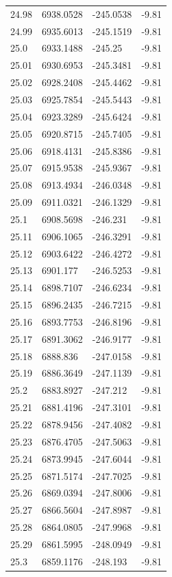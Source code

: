 \begin{table}[H]
\begin{tabular}{llll}
24.98 & 6938.0528 & -245.0538 & -9.81 \\
24.99 & 6935.6013 & -245.1519 & -9.81 \\
25.0 & 6933.1488 & -245.25 & -9.81 \\
25.01 & 6930.6953 & -245.3481 & -9.81 \\
25.02 & 6928.2408 & -245.4462 & -9.81 \\
25.03 & 6925.7854 & -245.5443 & -9.81 \\
25.04 & 6923.3289 & -245.6424 & -9.81 \\
25.05 & 6920.8715 & -245.7405 & -9.81 \\
25.06 & 6918.4131 & -245.8386 & -9.81 \\
25.07 & 6915.9538 & -245.9367 & -9.81 \\
25.08 & 6913.4934 & -246.0348 & -9.81 \\
25.09 & 6911.0321 & -246.1329 & -9.81 \\
25.1 & 6908.5698 & -246.231 & -9.81 \\
25.11 & 6906.1065 & -246.3291 & -9.81 \\
25.12 & 6903.6422 & -246.4272 & -9.81 \\
25.13 & 6901.177 & -246.5253 & -9.81 \\
25.14 & 6898.7107 & -246.6234 & -9.81 \\
25.15 & 6896.2435 & -246.7215 & -9.81 \\
25.16 & 6893.7753 & -246.8196 & -9.81 \\
25.17 & 6891.3062 & -246.9177 & -9.81 \\
25.18 & 6888.836 & -247.0158 & -9.81 \\
25.19 & 6886.3649 & -247.1139 & -9.81 \\
25.2 & 6883.8927 & -247.212 & -9.81 \\
25.21 & 6881.4196 & -247.3101 & -9.81 \\
25.22 & 6878.9456 & -247.4082 & -9.81 \\
25.23 & 6876.4705 & -247.5063 & -9.81 \\
25.24 & 6873.9945 & -247.6044 & -9.81 \\
25.25 & 6871.5174 & -247.7025 & -9.81 \\
25.26 & 6869.0394 & -247.8006 & -9.81 \\
25.27 & 6866.5604 & -247.8987 & -9.81 \\
25.28 & 6864.0805 & -247.9968 & -9.81 \\
25.29 & 6861.5995 & -248.0949 & -9.81 \\
25.3 & 6859.1176 & -248.193 & -9.81 \\

\end{tabular}
\end{table}
